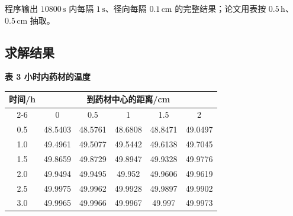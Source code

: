 \documentclass[withoutpreface,bwprint]{cumcm_thesis}
\begin{document}
程序输出 \(10800\,\text{s}\) 内每隔 \(1\,\text{s}\)、径向每隔 \(0.1\,\text{cm}\) 的完整结果；论文用表按 \(0.5\,\text{h}\)、\(0.5\,\text{cm}\) 抽取。



\subsection{求解结果}

\begin{table}[htbp]
    \centering
    \textbf{\large 表 3 小时内药材的温度}
    \vspace{5mm} %
    
    \renewcommand{\arraystretch}{1.6}
    
    \begin{tabular}{|c|c|c|c|c|c|}
        \hline
        \multirow{2}{*}{时间/h} & \multicolumn{5}{c|}{到药材中心的距离/cm} \\
        \cline{2-6} %
         & 0 & 0.5 & 1 & 1.5 & 2 \\
        \hline
        0.5 & 48.5403 & 48.5761 & 48.6808 & 48.8471 & 49.0497 \\
        \hline
        1.0 & 49.4961 & 49.5077 & 49.5442 & 49.6138 & 49.7045 \\
        \hline
        1.5 & 49.8659 & 49.8729 & 49.8947 & 49.9328 & 49.9776 \\
        \hline
        2.0 & 49.9494 & 49.9495 & 49.952 & 49.9606 & 49.9619 \\
        \hline
        2.5 & 49.9975 & 49.9962 & 49.9928 & 49.9897 & 49.9902 \\
        \hline
        3.0 & 49.9965 & 49.9966 & 49.9967 & 49.997 & 49.9973 \\
        \hline
    \end{tabular}
\end{table}
\end{document}
